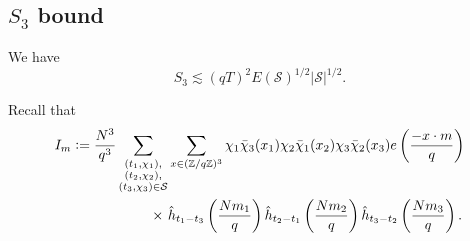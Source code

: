 \subsection{$S_3$ bound}
\begin{proposition}\label{s_3bound}
    We have \[
    S_3 \lesssim (qT)^2 E(\mathcal{S})^{1/2} |\mathcal{S}|^{1/2}.
    \]
\end{proposition}
Recall that \begin{align*}
	I_m\defeq\frac{N^3}{q^3}\sum_{\substack{(t_1,\chi_1),\\(t_2,\chi_2),\\(t_3,\chi_3)\in\mathcal{S}}} &\sum_{x\in (\mathbb{Z}/q\mathbb{Z})^3}\chi_1\bar{\chi}_3(x_1)\chi_2\bar{\chi}_1(x_2)\chi_3\bar{\chi}_2(x_3) e\left(\frac{-x\cdot m}{q}\right)\\
	\times \ &\hat{h}_{t_1-t_3}\left(\frac{Nm_1}{q}\right)\hat{h}_{t_2-t_1}\left(\frac{Nm_2}{q}\right)\hat{h}_{t_3-t_2}\left(\frac{Nm_3}{q}\right).
\end{align*}

